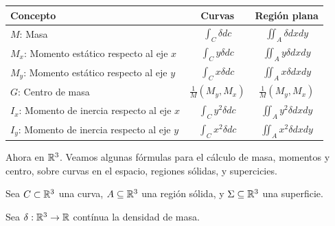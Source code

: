 \begin{center}
\begin{tabular}{|p{4cm}|c|c| }
  \hline
  Concepto                               & Curvas                       & Región plana                    \\
  \hline
  \hline
  $M$: Masa                                   & $\int_C \delta dc$       & $\iint_A \delta dxdy$       \\
  \hline
  $M_x$: Momento estático respecto al eje $x$   & $\int_C y \delta dc$   & $\iint_A y \delta dxdy$   \\
  \hline
  $M_y$: Momento estático respecto al eje $y$   & $\int_C x \delta dc$   & $\iint_A x \delta dxdy$   \\
  \hline
  $G$: Centro de masa                         & $ \frac{1}{M} (M_y, M_x)$ & $ \frac{1}{M} (M_y, M_x)$    \\
  \hline
  $I_x$: Momento de inercia respecto al eje $x$ & $ \int_C y^2 \delta dc$ & $\iint_A y^2 \delta dxdy$ \\
  \hline
  $I_y$: Momento de inercia respecto al eje $y$ & $ \int_C x^2 \delta dc$ & $ \iint_A x^2 \delta dxdy$ \\
  \hline

\end{tabular}
\end{center}

Ahora en $\mathbb{R}^3$.  Veamos algunas fórmulas para el cálculo de masa, momentos y centro, sobre curvas en el espacio, regiones sólidas, y supercicies.

Sea $ C \subset \mathbb{R}^3$ una curva, $A \subseteq \mathbb{R}^3$ una región sólida, y $\Sigma \subseteq \mathbb{R}^3$ una superficie.

Sea $ \delta: \mathbb{R}^3 \to \mathbb{R}$ contínua la densidad de masa.

\onecolumn

